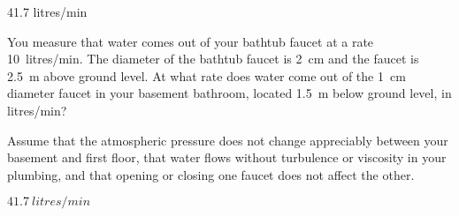 \begin{solution}
	\begin{finalanswer}
		41.7 litres/min
	\end{finalanswer}
\end{solution}
\question You measure that water comes out of your bathtub faucet at a rate \SI{10}{litres/min}. The diameter of the bathtub faucet is \SI{2}{cm} and the faucet is \SI{2.5}{m} above ground level. At what rate does water come out of the \SI{1}{cm} diameter faucet in your basement bathroom, located \SI{1.5}{m} below ground level, in \si{litres/min}?

Assume that the atmospheric pressure does not change appreciably between your basement and first floor, that water flows without turbulence or viscosity in your plumbing, and that opening or closing one faucet does not affect the other.

\begin{finalanswer}
	$\SI{41.7}{litres/min}$
\end{finalanswer}

